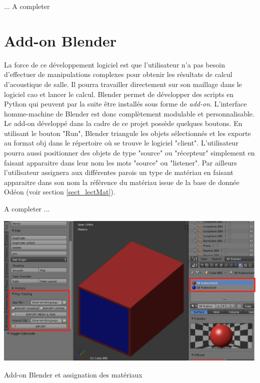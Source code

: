 ... A completer



\section{Add-on Blender} \label{sect_add-on}
La force de ce développement logiciel est que l'utilisateur n'a pas besoin d'effectuer de manipulations complexes pour obtenir les résultats de calcul d'acoustique de salle. Il pourra travailler directement sur son maillage dans le logiciel \gls{cao} et lancer le calcul. Blender permet de développer des scripts en Python qui peuvent par la suite être installés sous forme de \textit{add-on}. L'interface homme-machine de Blender est donc complètement modulable et personnalisable. Le add-on développé dans la cadre de ce projet possède quelques boutons. En utilisant le bouton "Run", Blender triangule les objets sélectionnés et les exporte au format \gls{obj} dans le répertoire où se trouve le logiciel "client". L'utilisateur pourra aussi positionner des objets de type "source" ou "récepteur" simplement en faisant apparaitre dans leur nom les mots "source" ou "listener". Par ailleurs l'utilisateur assignera aux différentes parois un type de matériau en faisant apparaitre dans son nom la référence du matériau issue de la base de donnée Odéon (voir section \ref{sect_lectMat}). 

A completer ...


\begin{figureth}
	\includegraphics[width=\linewidth]{images/add-on}
	\caption{Add-on Blender et assignation des matériaux}
\end{figureth}










